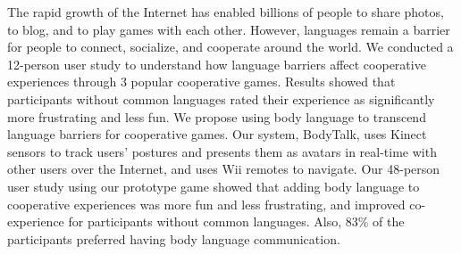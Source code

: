 
The rapid growth of the Internet has enabled billions of people to share photos, to blog, and to play games with each other. However, languages remain a barrier for people to connect, socialize, and cooperate around the world. 
We conducted a 12-person user study to understand how language barriers affect cooperative experiences through 3 popular cooperative games. Results showed that participants without common languages rated their experience as significantly more frustrating and less fun. We propose using body language to transcend language barriers for cooperative games. Our system, BodyTalk, uses Kinect sensors to track users' postures and presents them as avatars in real-time with other users over the Internet, and uses Wii remotes to navigate.  Our 48-person user study using our prototype game showed that adding body language to cooperative experiences was more fun and less frustrating, and improved co-experience for participants without common languages. Also, 83\% of the participants preferred having body language communication. 

%
